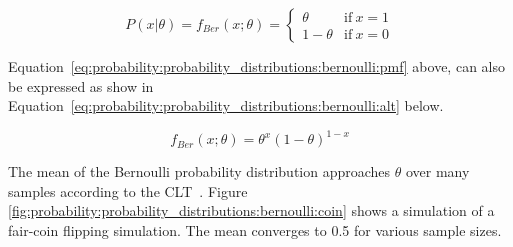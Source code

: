 \begin{equation}
      \label{eq:probability:probability_distributions:bernoulli:pmf}
      P(x \vert \theta) = f_{Ber}(x; \theta) =
      \begin{cases}
            \theta     & \text{if}\ x=1 \\
            1 - \theta & \text{if}\ x=0
      \end{cases}
\end{equation}

Equation~\eqref{eq:probability:probability_distributions:bernoulli:pmf} above, can also be expressed as show in Equation~\eqref{eq:probability:probability_distributions:bernoulli:alt} below.

\begin{equation}
      \label{eq:probability:probability_distributions:bernoulli:alt}
      f_{Ber}(x; \theta) = \theta^{x}(1-\theta)^{1-x}
\end{equation}

The mean of the Bernoulli probability distribution approaches $\theta$ over many samples according to the \acs{CLT}~\cite{ref:grinstead:1997}. Figure \ref{fig:probability:probability_distributions:bernoulli:coin} shows a simulation of a fair-coin flipping simulation. The mean converges to 0.5 for various sample sizes.

